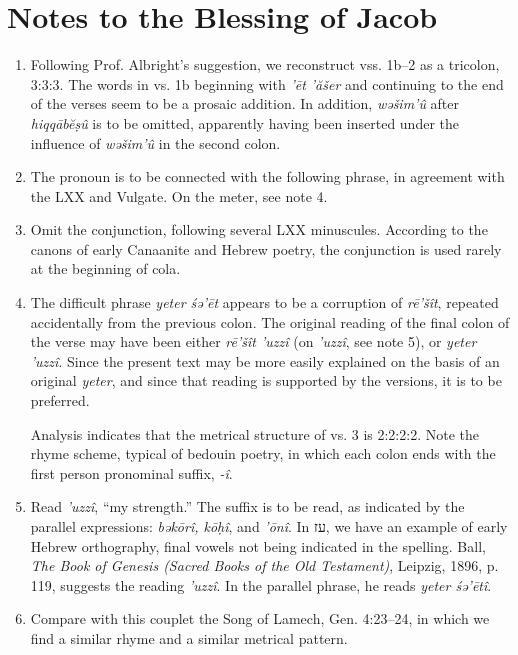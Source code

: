 \section*{Notes to the Blessing of Jacob}

\begin{enumerate}

\item
Following Prof. Albright's suggestion, we reconstruct vss. 1b--2 as a
tricolon, 3:3:3. The words in vs. 1b beginning with \emph{'ēt 'ăšer} and
continuing to the end of the verses seem to be a prosaic addition. In addition,
\emph{wəšim'û} after \emph{hiqqābĕṣû} is to be omitted, apparently having been
inserted under the influence of \emph{wəšim'û} in the second colon.

\item
The pronoun is to be connected with the following phrase, in agreement with
the LXX and Vulgate. On the meter, see note 4.

\item
Omit the conjunction, following several LXX minuscules. According to the
canons of early Canaanite and Hebrew poetry, the conjunction is used rarely at
the beginning of cola.

\item
The difficult phrase \emph{yeter śə'ēt} appears to be a corruption of
\emph{rē'šît}, repeated accidentally from the previous colon. The original
reading of the final colon of the verse may have been either \emph{rē'šît
'uzzî} (on \emph{'uzzî}, see note 5), or \emph{yeter 'uzzî}. Since the present
text may be more easily explained on the basis of an original \emph{yeter},
and since that reading is supported by the versions, it is to be preferred.

Analysis indicates that the metrical structure of vs. 3 is 2:2:2:2. Note the
rhyme scheme, typical of bedouin poetry, in which each colon ends with the
first person pronominal suffix, \emph{-î}.

\item
Read \emph{'uzzî}, ``my strength.'' The suffix is to be read, as indicated by
the parallel expressions: \emph{bəkōrî, kōḥî}, and \emph{'ōnî}. In עז, we
have an example of early Hebrew orthography, final vowels not being indicated
in the spelling. Ball, \emph{The Book of Genesis (Sacred Books of the Old
Testament)}, Leipzig, 1896, p. 119, suggests the reading \emph{'uzzî}. In the
parallel phrase, he reads \emph{yeter śə'ētî}.

\item
Compare with this couplet the Song of Lamech, Gen. 4:23--24, in which we find
a similar rhyme and a similar metrical pattern.


\end{enumerate}
